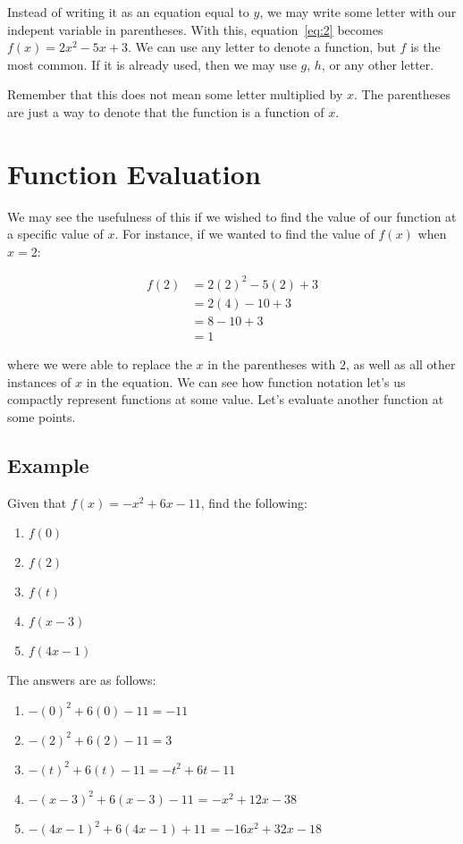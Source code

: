 \documentclass[12pt]{article}
\begin{document}
Instead of writing it as an equation equal to $y$, we may write some letter with our indepent variable in parentheses.
With this, equation~\eqref{eq:2} becomes $f(x) = 2x^2-5x+3$.
We can use any letter to denote a function, but $f$ is the most common.
If it is already used, then we may use $g$, $h$, or any other letter.

Remember that this does not mean some letter multiplied by $x$.
The parentheses are just a way to denote that the function is a function of $x$.

\section{Function Evaluation}
We may see the usefulness of this if we wished to find the value of our function at a specific value of $x$.
For instance, if we wanted to find the value of $f(x)$ when $x = 2$:

\begin{align*}
    f(2) & = 2(2)^2-5(2)+3 \\
         & = 2(4)-10+3     \\
         & = 8-10+3        \\
         & = 1
\end{align*}

where we were able to replace the $x$ in the parentheses with $2$, as well as all other instances of $x$ in the equation.
We can see how function notation let's us compactly represent functions at some value.
Let's evaluate another function at some points.


\subsection{Example}
Given that $f(x) = -x^2+6x-11$, find the following:

\begin{enumerate}
    \item $f(0)$
    \item $f(2)$
    \item $f(t)$
    \item $f(x-3)$
    \item $f(4x-1)$
\end{enumerate}

The answers are as follows:

\begin{enumerate}
    \item $-(0)^2+6(0)-11 = -11$
    \item $-(2)^2+6(2)-11 = 3$
    \item $-(t)^2+6(t)-11 = -t^2+6t-11$
    \item $-(x-3)^2+6(x-3)-11$ = $-x^2+12x-38$
    \item $-(4x-1)^2+6(4x-1)+11$ = $-16x^2+32x-18$
\end{enumerate}
\end{document}
